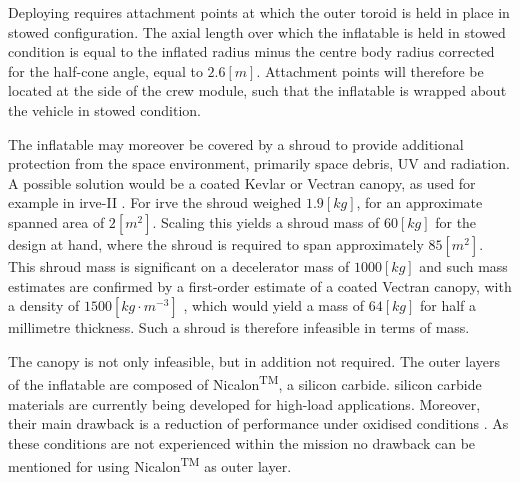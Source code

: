 Deploying requires attachment points at which the outer toroid is held in place in stowed configuration. The axial length over which the inflatable is held in stowed condition is equal to the inflated radius minus the centre body radius corrected for the half-cone angle, equal to $2.6 \left[m\right]$. Attachment points will therefore be located at the side of the crew module, such that the inflatable is wrapped about the vehicle in stowed condition. 

The inflatable may moreover be covered by a shroud to provide additional protection from the space environment, primarily space debris, UV and radiation. A possible solution would be a coated Kevlar or Vectran canopy, as used for example in \gls{irve}-II \cite{Dillman2010}. For \gls{irve} the shroud weighed $1.9 \left[kg\right]$, for an approximate spanned area of $2 \left[m^{2}\right]$. Scaling this yields a shroud mass of $60 \left[kg\right]$ for the design at hand, where the shroud is required to span approximately $85 \left[m^{2}\right]$. This shroud mass is significant on a decelerator mass of $1000 \left[kg\right]$ and such mass estimates are confirmed by a first-order estimate of a coated Vectran canopy, with a density of $1500 \left[kg\cdot m^{-3}\right]$ \cite{Miller2014}, which would yield a mass of $64 \left[kg\right]$ for half a millimetre thickness. Such a shroud is therefore infeasible in terms of mass.

The canopy is not only infeasible, but in addition not required. The outer layers of the inflatable are composed of Nicalon\textsuperscript{TM}, a silicon carbide. silicon carbide materials are currently being developed for high-load applications. Moreover, their main drawback is a reduction of performance under oxidised conditions \cite{Dutta2001}. As these conditions are not experienced within the mission no drawback can be mentioned for using Nicalon\textsuperscript{TM} as outer layer.



